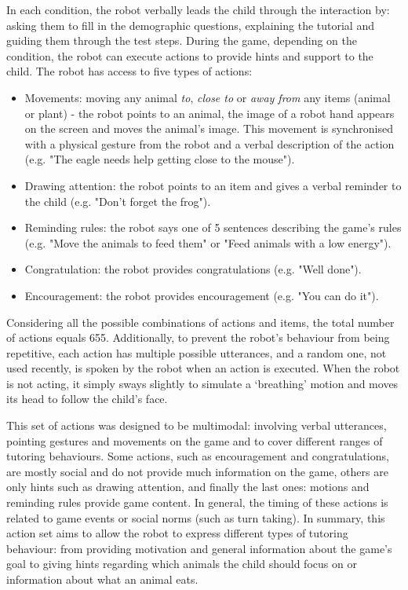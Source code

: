 In each condition, the robot verbally leads the child through the interaction by: asking them to fill in the demographic questions, explaining the tutorial and guiding them through the test steps. During the game, depending on the condition, the robot can execute actions to provide hints and support to the child. The robot has access to five types of actions:
\begin{itemize}
	\item Movements: moving any animal \emph{to}, \emph{close to} or \emph{away from} any items (animal or plant) - the robot points to an animal, the image of a robot hand appears on the screen and moves the animal's image. This movement is synchronised with a physical gesture from the robot and a verbal description of the action (e.g. "The eagle needs help getting close to the mouse").
	\item Drawing attention: the robot points to an item and gives a verbal reminder to the child (e.g. "Don't forget the frog").
	\item Reminding rules: the robot says one of 5 sentences describing the game's rules (e.g. "Move the animals to feed them" or "Feed animals with a low energy").
	\item Congratulation: the robot provides congratulations (e.g. "Well done").
	\item Encouragement: the robot provides encouragement (e.g. "You can do it").
\end{itemize}
Considering all the possible combinations of actions and items, the total number of actions equals 655. Additionally, to prevent the robot's behaviour from being repetitive, each action has multiple possible utterances, and a random one, not used recently, is spoken by the robot when an action is executed. When the robot is not acting, it simply sways slightly to simulate a `breathing' motion and moves its head to follow the child's face. 

This set of actions was designed to be multimodal: involving verbal utterances, pointing gestures and movements on the game and to cover different ranges of tutoring behaviours. Some actions, such as encouragement and congratulations, are mostly social and do not provide much information on the game, others are only hints such as drawing attention, and finally the last ones: motions and reminding rules provide game content. In general, the timing of these actions is related to game events or social norms (such as turn taking). In summary, this action set aims to allow the robot to express different types of tutoring behaviour: from providing motivation and general information about the game's goal to giving hints regarding which animals the child should focus on or information about what an animal eats. 

